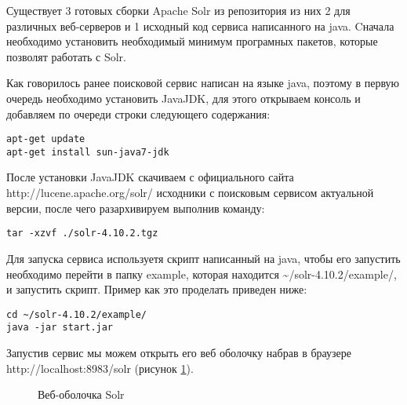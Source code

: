 Существует 3 готовых сборки Apache Solr из репозитория из них 2 для различных веб-серверов и 1 исходный код сервиса написанного на java. Cначала необходимо установить необходимый минимум програмных пакетов, которые позволят работать с Solr.

Как говорилось ранее поисковой сервис написан на языке java, поэтому в первую очередь необходимо установить JavaJDK, для этого открываем консоль и добавляем по очереди строки следующего содержания:

\begin{lstlisting}
apt-get update
apt-get install sun-java7-jdk
\end{lstlisting}

После установки JavaJDK скачиваем с официального сайта http://lucene.apache.org/solr/ исходники с поисковым сервисом актуальной версии, после чего разархивируем выполнив команду:

\begin{lstlisting}
tar -xzvf ./solr-4.10.2.tgz
\end{lstlisting}

Для запуска сервиса используетя скрипт написанный на java, чтобы его запустить необходимо перейти в папку example, которая находится \textasciitilde/solr-4.10.2/example/, и запустить скрипт. Пример как это проделать приведен ниже:

\begin{lstlisting}
cd ~/solr-4.10.2/example/
java -jar start.jar
\end{lstlisting}

Запустив сервис мы можем открыть его веб оболочку набрав в браузере http://localhost:8983/solr (рисунок \ref{ris:solr}).

\begin{figure}[ht] 
\caption{Веб-оболочка Solr}
\label{ris:solr}
\end{figure}
